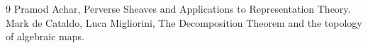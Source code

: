 \documentclass[8pt]{article}
\numberwithin{equation}{section}
\newcommand{\IC}[0]{\mathrm{IC}}
\newcommand{\Perv}[0]{\mathrm{Perv}}
\begin{document}




\begin{thebibliography}{9}
Pramod Achar, Perverse Sheaves and Applications to Representation Theory.
Mark de Cataldo, Luca Migliorini, The Decomposition Theorem and the topology of algebraic maps.
\end{thebibliography}
\end{document}
